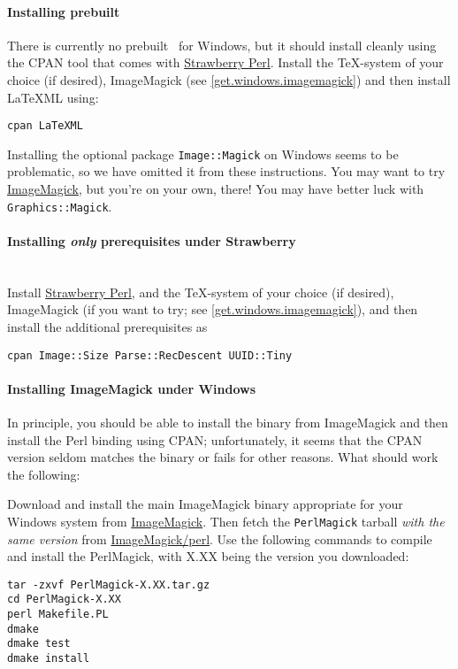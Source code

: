 \documentclass{article}
\begin{document}
\paragraph*{Installing prebuilt}\label{get.windows.strawberry}
There is currently no prebuilt \LaTeXML\ for Windows,
but it should install cleanly using the CPAN tool that comes with
\href{http://strawberryperl.com}{Strawberry Perl}.
Install the \TeX-system of your choice (if desired),
ImageMagick (see \ref{get.windows.imagemagick})
and then install LaTeXML using:
\begin{lstlisting}[style=shell]
cpan LaTeXML
\end{lstlisting}

Installing the optional package \texttt{Image::Magick} on Windows seems to be problematic,
so we have omitted it from these instructions.
You may want to try \href{http://www.imagemagick.org/}{ImageMagick}, but
you're on your own, there!  You may  have better luck with \texttt{Graphics::Magick}.

\paragraph*{Installing \emph{only} prerequisites  under Strawberry}\label{get.windows.strawberry.prereq}\\
Install \href{http://strawberryperl.com}{Strawberry Perl}, and
the \TeX-system of your choice (if desired), 
ImageMagick (if you want to try; see \ref{get.windows.imagemagick}),
and then install the additional prerequisites as
\begin{lstlisting}[style=shell]
cpan Image::Size Parse::RecDescent UUID::Tiny
\end{lstlisting}

\paragraph*{Installing ImageMagick under Windows}\label{get.windows.imagemagick}
In principle, you should be able to install the binary from ImageMagick
and then install the Perl binding using CPAN; unfortunately, it seems that the
CPAN version seldom matches the binary or fails for other reasons.  What
should work the following:

Download and install the main ImageMagick binary appropriate for your Windows system
from \href{http://imagemagick.org/script/binary-releases.php#windows}{ImageMagick}.
Then fetch the \texttt{PerlMagick} tarball \emph{with the same version} from
\href{http://imagemagick.com/download/perl/}{ImageMagick/perl}.
Use the following commands to compile and install the PerlMagick,
with X.XX being the version you downloaded:
\begin{lstlisting}[style=shell]
tar -zxvf PerlMagick-X.XX.tar.gz
cd PerlMagick-X.XX
perl Makefile.PL
dmake
dmake test
dmake install
\end{lstlisting}
\end{document}
